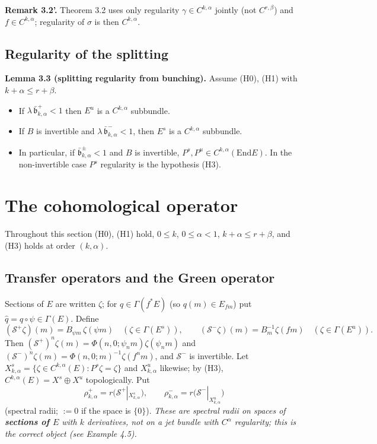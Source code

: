 \documentclass[11pt,a4paper]{article}
\theoremstyle{plain}
\theoremstyle{definition}
\theoremstyle{remark}
\numberwithin{equation}{section}
\numberwithin{figure}{section}
\begin{document}
\textbf{Remark 3.2'.} Theorem 3.2 uses only regularity $\gamma\in C^{k,\alpha}$ jointly (not $C^{r,\beta}$) and $f\in C^{k,\alpha}$; regularity of $\sigma$ is then $C^{k,\alpha}$.

\subsection{Regularity of the splitting}

\textbf{Lemma 3.3 (splitting regularity from bunching).} Assume (H0), (H1) with $k+\alpha\le r+\beta$.
\begin{itemize}
    \item[(a)] If $\lambda\,\bar{\mathfrak b}^+_{k,\alpha}<1$ then $E^u$ is a $C^{k,\alpha}$ subbundle.
    \item[(b)] If $B$ is invertible and $\lambda\,\bar{\mathfrak b}^-_{k,\alpha}<1$, then $E^s$ is a $C^{k,\alpha}$ subbundle.
    \item[(c)] In particular, if $\bar{\mathfrak b}^\pm_{k,\alpha}<1$ and $B$ is invertible, $P^s,P^u\in C^{k,\alpha}(\mathrm{End}E)$. In the non-invertible case $P^s$ regularity is the hypothesis (H3).
\end{itemize}

\section{The cohomological operator}

Throughout this section (H0), (H1) hold, $0\le k$, $0\le\alpha<1$, $k+\alpha\le r+\beta$, and (H3) holds at order $(k,\alpha)$.

\subsection{Transfer operators and the Green operator}

Sections of $E$ are written $\zeta$; for $q\in\Gamma(f^*E)$ (so $q(m)\in E_{fm}$) put $\hat q=q\circ\psi\in\Gamma(E)$. Define
\[
(\mathcal S^+\zeta)(m)=B_{\psi m}\,\zeta(\psi m)\quad(\zeta\in\Gamma(E^s)),\qquad(\mathcal S^-\zeta)(m)=B_m^{-1}\zeta(fm)\quad(\zeta\in\Gamma(E^u)).
\]
Then $(\mathcal S^+)^n\zeta(m)=\Phi(n,0;\psi_nm)\zeta(\psi_nm)$ and $(\mathcal S^-)^n\zeta(m)=\Phi(n,0;m)^{-1}\zeta(f^nm)$, and $\mathcal S^-$ is invertible. Let $X^s_{k,\alpha}=\{\zeta\in C^{k,\alpha}(E):P^s\zeta=\zeta\}$ and $X^u_{k,\alpha}$ likewise; by (H3), $C^{k,\alpha}(E)=X^s\oplus X^u$ topologically. Put
\[
\rho^+_{k,\alpha}=r\big(\mathcal S^+|_{X^s_{k,\alpha}}\big),\qquad\rho^-_{k,\alpha}=r\big(\mathcal S^-|_{X^u_{k,\alpha}}\big)
\]
(spectral radii; $:=0$ if the space is $\{0\}$). \textit{These are spectral radii on spaces of \textbf{sections of $E$} with $k$ derivatives, not on a jet bundle with $C^\alpha$ regularity; this is the correct object (see Example 4.5).}
\end{document}
